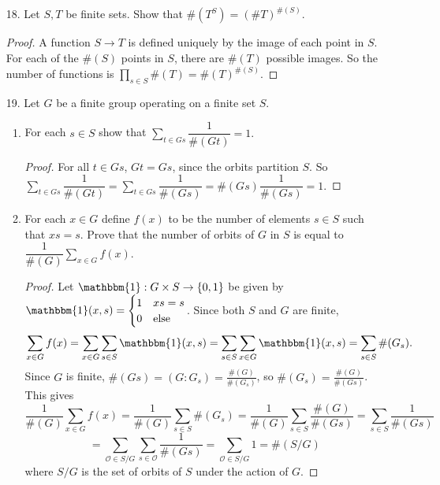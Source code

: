 \documentclass[10pt]{article}
\begin{document}
\begin{enumerate}
\begin{proof}
\end{proof}

\item[18.] Let $S,T$ be finite sets.  Show that $\#(T^S) = (\# T) ^{\#(S)}$.

\begin{proof}
A function $S \rightarrow T$ is defined uniquely by the image of each point in $S$.  For each of the $\#(S)$ points in $S$, there are $\#(T)$ possible images.  So the number of functions is $\prod\limits_{s \in S} \#(T) = \#(T)^{\#(S)}$.
\end{proof}

\item[19.]
Let $G$ be a finite group operating on a finite set $S$.  
\begin{enumerate}
\item For each $s \in S$ show that $\sum\limits_{t \in Gs} \dfrac{1}{\#(Gt)} = 1.$
\begin{proof}
For all $t \in Gs$, $Gt = Gs$, since the orbits partition $S$.  So $\sum\limits_{t \in Gs} \dfrac{1}{\#(Gt)} = \sum\limits_{t \in Gs} \dfrac{1}{\#(Gs)} = \#(Gs) \dfrac{1}{\#(Gs)} = 1.$
\end{proof}
\item For each $x \in G$ define $f(x)$ to be the number of elements $s \in S$ such that $xs = s$.  Prove that the number of orbits of $G$ in $S$ is equal to $ \dfrac{1}{\#(G)} \sum\limits_{x \in G} f(x).$

\begin{proof}
Let $\mathbbm{1}: G \times S \rightarrow \{0,1\}$ be given by $\mathbbm{1}(x,s) = \begin{cases} 1 & xs = s \\ 0 & \text{else} \end{cases}$.  Since both $S$ and $G$ are finite,
$$\sum\limits_{x \in G} f(x)
= \sum\limits_{x \in G} \sum\limits_{s \in S} \mathbbm{1}(x,s)
= \sum\limits_{s \in S} \sum\limits_{x \in G} \mathbbm{1}(x,s)
= \sum\limits_{s \in S} \#(G_s).$$
Since $G$ is finite, $\#(Gs) = (G : G_s) = \frac{\#(G)}{\#(G_s)}$, so $\#(G_s) = \frac{\#(G)}{\#(Gs)}$.  This gives
$$
\dfrac{1}{\#(G)} \sum\limits_{x \in G} f(x) = \dfrac{1}{\#(G)} \sum\limits_{s \in S} \#(G_s) = \dfrac{1}{\#(G)} \sum\limits_{s \in S} \frac{\#(G)}{\#(Gs)} = \sum\limits_{s \in S} \frac{1}{\#(Gs)}
$$
$$
= \sum\limits_{\mathcal{O} \in S / G} \sum\limits_{s \in \mathcal{O}} \frac{1}{\#(Gs)} = \sum\limits_{\mathcal{O} \in S / G} 1 = \#(S / G)
$$
where $S / G$ is the set of orbits of $S$ under the action of $G$.
\end{proof}

\end{enumerate}

\end{enumerate}
\end{document}
